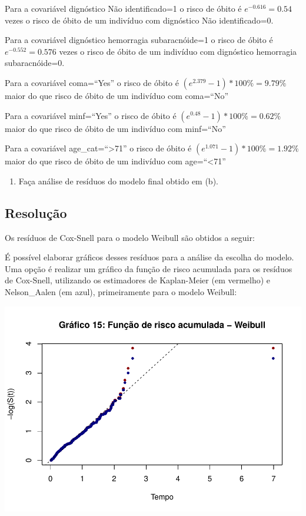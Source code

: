 \documentclass[]{article}
\providecommand{\tightlist}{%
  \setlength{\itemsep}{0pt}\setlength{\parskip}{0pt}}
\begin{document}
Para a covariável dignóstico Não identificado=1 o risco de óbito é
\(e^{-0.616}=0.54\) vezes o risco de óbito de um indivíduo com
dignóstico Não identificado=0.

Para a covariável dignóstico hemorragia subaracnóide=1 o risco de óbito
é \(e^{-0.552}=0.576\) vezes o risco de óbito de um indivíduo com
dignóstico hemorragia subaracnóide=0.

Para a covariável coma=``Yes'' o risco de óbito é
\((e^{2.379}-1)*100\%=9.79 \%\) maior do que risco de óbito de um
indivíduo com coma=``No''

Para a covariável minf=``Yes'' o risco de óbito é
\((e^{0.48}-1)*100\%=0.62 \%\) maior do que risco de óbito de um
indivíduo com minf=``No''

Para a covariável age\_cat=``\textgreater{}71'' o risco de óbito é
\((e^{1.071}-1)*100\%=1.92\%\) maior do que risco de óbito de um
indivíduo com age=``\textless{}71''

\newpage

\begin{enumerate}
\def\labelenumi{(\alph{enumi})}
\setcounter{enumi}{3}
\tightlist
\item
  Faça análise de resíduos do modelo final obtido em (b).
\end{enumerate}

\subsection{Resolução}\label{resolucao-3}

Os resíduos de Cox-Snell para o modelo Weibull são obtidos a seguir:

É possível elaborar gráficos desses resíduos para a análise da escolha
do modelo. Uma opção é realizar um gráfico da função de risco acumulada
para os resíduos de Cox-Snell, utilizando os estimadores de Kaplan-Meier
(em vermelho) e Nelson\_Aalen (em azul), primeiramente para o modelo
Weibull:

\begin{center}\includegraphics[width=0.8\linewidth]{Atividade_3_files/figure-latex/unnamed-chunk-19-1} \end{center}
\end{document}
